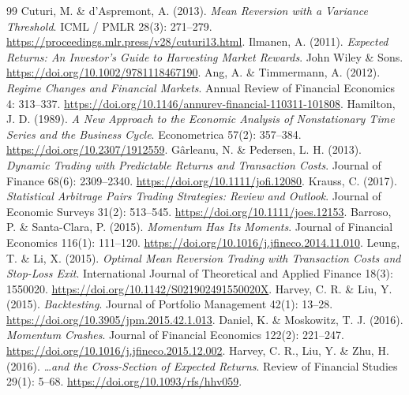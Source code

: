 \begin{thebibliography}{99}
 Cuturi, M. \& d'Aspremont, A. (2013). \emph{Mean Reversion with a Variance Threshold}. ICML / PMLR 28(3): 271--279. \href{https://proceedings.mlr.press/v28/cuturi13.html}{https://proceedings.mlr.press/v28/cuturi13.html}.
 Ilmanen, A. (2011). \emph{Expected Returns: An Investor's Guide to Harvesting Market Rewards}. John Wiley \& Sons. \href{https://doi.org/10.1002/9781118467190}{https://doi.org/10.1002/9781118467190}.
 Ang, A. \& Timmermann, A. (2012). \emph{Regime Changes and Financial Markets}. Annual Review of Financial Economics 4: 313--337. \href{https://doi.org/10.1146/annurev-financial-110311-101808}{https://doi.org/10.1146/annurev-financial-110311-101808}.
 Hamilton, J. D. (1989). \emph{A New Approach to the Economic Analysis of Nonstationary Time Series and the Business Cycle}. Econometrica 57(2): 357--384. \href{https://doi.org/10.2307/1912559}{https://doi.org/10.2307/1912559}.
 Gârleanu, N. \& Pedersen, L. H. (2013). \emph{Dynamic Trading with Predictable Returns and Transaction Costs}. Journal of Finance 68(6): 2309--2340. \href{https://doi.org/10.1111/jofi.12080}{https://doi.org/10.1111/jofi.12080}.
 Krauss, C. (2017). \emph{Statistical Arbitrage Pairs Trading Strategies: Review and Outlook}. Journal of Economic Surveys 31(2): 513--545. \href{https://doi.org/10.1111/joes.12153}{https://doi.org/10.1111/joes.12153}.
 Barroso, P. \& Santa-Clara, P. (2015). \emph{Momentum Has Its Moments}. Journal of Financial Economics 116(1): 111--120. \href{https://doi.org/10.1016/j.jfineco.2014.11.010}{https://doi.org/10.1016/j.jfineco.2014.11.010}.
 Leung, T. \& Li, X. (2015). \emph{Optimal Mean Reversion Trading with Transaction Costs and Stop-Loss Exit}. International Journal of Theoretical and Applied Finance 18(3): 1550020. \href{https://doi.org/10.1142/S021902491550020X}{https://doi.org/10.1142/S021902491550020X}.
 Harvey, C. R. \& Liu, Y. (2015). \emph{Backtesting}. Journal of Portfolio Management 42(1): 13--28. \href{https://doi.org/10.3905/jpm.2015.42.1.013}{https://doi.org/10.3905/jpm.2015.42.1.013}.
 Daniel, K. \& Moskowitz, T. J. (2016). \emph{Momentum Crashes}. Journal of Financial Economics 122(2): 221--247. \href{https://doi.org/10.1016/j.jfineco.2015.12.002}{https://doi.org/10.1016/j.jfineco.2015.12.002}.
 Harvey, C. R., Liu, Y. \& Zhu, H. (2016). \emph{…and the Cross-Section of Expected Returns}. Review of Financial Studies 29(1): 5--68. \href{https://doi.org/10.1093/rfs/hhv059}{https://doi.org/10.1093/rfs/hhv059}.

\end{thebibliography}

